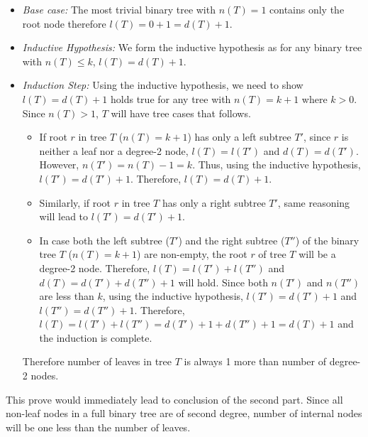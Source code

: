 \begin{itemize}\itemsep=0pt
\item[] \textit{Base case:} The most trivial binary tree with $n(T)=1$ contains only the root node therefore $l(T) = 0 + 1 = d(T) + 1$.
\item[] \textit{Inductive Hypothesis:} We form the inductive hypothesis as for any binary tree with $n(T) \leq k$, $l(T) = d(T) + 1$.
\item[] \textit{Induction Step:} Using the inductive hypothesis, we need to show $l(T) = d(T)+1$ holds true for any tree with $n(T) = k+1$ where $k > 0$. Since $n(T) > 1$, $T$ will have tree cases that follows.
  \begin{itemize}\itemsep=0pt
    \item[] If root $r$ in tree $T$ ($n(T) = k+1$) has only a left subtree $T'$, since $r$ is neither a leaf nor a degree-2 node, $l(T) = l(T')$ and $d(T)=d(T')$. However, $n(T') = n(T) - 1 = k$. Thus, using the inductive hypothesis, $l(T') = d(T') + 1$. Therefore, $l(T) = d(T) + 1$.
    \item[] Similarly, if root $r$ in tree $T$ has only a right subtree $T'$, same reasoning will lead to $l(T') = d(T') + 1$. 
    \item[] In case both the left subtree ($T'$) and the right subtree ($T''$) of the binary tree $T$ ($n(T) = k+1$) are non-empty, the root $r$ of tree $T$ will be a degree-2 node. Therefore, $l(T) = l(T') + l(T'')$ and $d(T) = d(T') + d(T'') + 1$ will hold.
    Since both $n(T')$ and $n(T'')$ are less than $k$, using the inductive hypothesis, $l(T') = d(T') + 1$ and $l(T'') = d(T'') + 1$.
    Therefore, $l(T) = l(T') + l(T'') = d(T') + 1 + d(T'') + 1 = d(T) + 1$ and the induction is complete. 
  \end{itemize}
  Therefore number of leaves in tree $T$ is always 1 more than number of degree-2 nodes.
\end{itemize}
This prove would immediately lead to conclusion of the second part. Since all non-leaf nodes in a full binary tree are of second degree, number of internal nodes will be one less than the number of leaves.
